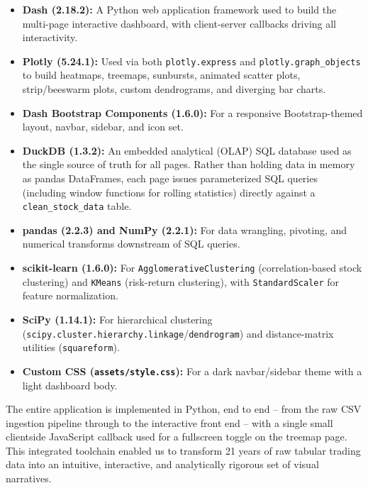 \documentclass[14pt,a4paper]{extreport}
\begin{document}
\begin{itemize}
    \item \textbf{Dash (2.18.2):} A Python web application framework used to
        build the multi-page interactive dashboard, with client-server
        callbacks driving all interactivity.
    \item \textbf{Plotly (5.24.1):} Used via both \texttt{plotly.express}
        and \texttt{plotly.graph\_objects} to build heatmaps, treemaps,
        sunbursts, animated scatter plots, strip/beeswarm plots, custom
        dendrograms, and diverging bar charts.
    \item \textbf{Dash Bootstrap Components (1.6.0):} For a responsive
        Bootstrap-themed layout, navbar, sidebar, and icon set.
    \item \textbf{DuckDB (1.3.2):} An embedded analytical (OLAP) SQL
        database used as the single source of truth for all pages. Rather
        than holding data in memory as pandas DataFrames, each page issues
        parameterized SQL queries (including window functions for rolling
        statistics) directly against a \texttt{clean\_stock\_data} table.
    \item \textbf{pandas (2.2.3) and NumPy (2.2.1):} For data wrangling,
        pivoting, and numerical transforms downstream of SQL queries.
    \item \textbf{scikit-learn (1.6.0):} For \texttt{AgglomerativeClustering}
        (correlation-based stock clustering) and \texttt{KMeans} (risk-return
        clustering), with \texttt{StandardScaler} for feature normalization.
    \item \textbf{SciPy (1.14.1):} For hierarchical clustering
        (\texttt{scipy.cluster.hierarchy.linkage}/\texttt{dendrogram}) and
        distance-matrix utilities (\texttt{squareform}).
    \item \textbf{Custom CSS (\texttt{assets/style.css}):} For a dark
        navbar/sidebar theme with a light dashboard body.
\end{itemize}

The entire application is implemented in Python, end to end -- from the raw
CSV ingestion pipeline through to the interactive front end -- with a single
small clientside JavaScript callback used for a fullscreen toggle on the
treemap page. This integrated toolchain enabled us to transform 21 years of
raw tabular trading data into an intuitive, interactive, and analytically
rigorous set of visual narratives.

\end{document}
